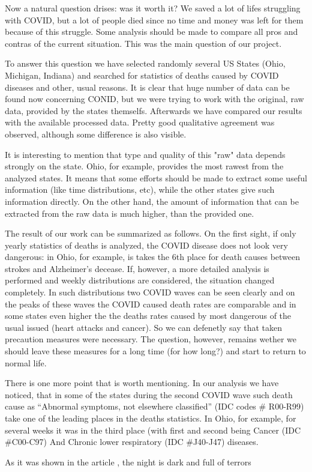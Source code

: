 \documentclass[conference]{IEEEtran}
\begin{document}
Now a natural question drises: was it worth it? We saved a lot of lifes struggling with COVID, but a lot of people died since no time and money was left for them because of this struggle. Some analysis should be made to compare all pros and contras of the current situation. This was the main question of our project.

To answer this question we have selected randomly several US States (Ohio, Michigan, Indiana) and searched for statistics of deaths caused by COVID diseases and other, usual reasons. It is clear that huge number of data can be found now concerning CONID, but we were trying to work with the original, raw data, provided by the states themselfs. Afterwards we have compared our results with the available processed data. Pretty good qualitative agreement  was observed, although some difference is also visible.

It is interesting to mention that type and quality of this "raw" data depends strongly on the state. Ohio, for example, provides the most rawest from the analyzed states. It means that some efforts should be made to extract some useful information (like time distributions, etc), while the other states give such information directly. On the other hand, the amount of information that can be extracted from the raw data is much higher, than the provided one.

The result of our work can be summarized as follows. On the first sight, if only yearly statistics of deaths is analyzed, the COVID disease does not look very dangerous: in Ohio, for example, is takes the 6th place for death causes between strokes and Alzheimer’s decease. If, however, a more detailed analysis is performed and weekly distributions are considered, the situation changed completely. In such distributions two COVID waves can be seen clearly and on the peaks of these waves the COVID caused death rates are comparable and in some states even higher the the deaths rates caused by most dangerous of the usual issued (heart attacks and cancer). So we can defenetly say that taken precaution measures were necessary. The question, however, remains wether we should leave these measures for a long time (for how long?) and  start to return to normal life.

There is one more point that is worth mentioning. In our analysis we have noticed, that in some of the states during the second COVID wave such death cause as “Abnormal symptoms, not elsewhere classified” (IDC codes \# R00-R99) take one of the leading places in the deaths statistics. In Ohio, for example, for several weeks it was in the third place (with first and second being Cancer (IDC \#C00-C97) And Chronic lower respiratory (IDC \#J40-J47) diseases.

As it was shown in the article \cite{IEEEexample:article_typical}, the night is dark and full of terrors




\end{document}
